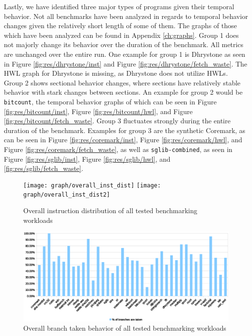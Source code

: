 \documentclass[../bachelor_paper.tex]{subfiles}
\begin{document}
Lastly, we have identified three major types of programs given their temporal behavior. Not all benchmarks have been analyzed in regards to temporal behavior changes given the relatively short length of some of them. The graphs of those which have been analyzed can be found in Appendix \ref{ch:graphs}. Group 1 does not majorly change its behavior over the duration of the benchmark. All metrics are unchanged over the entire run. One example for group 1 is Dhrystone as seen in Figure \ref{fig:res/dhrystone/inst} and Figure \ref{fig:res/dhrystone/fetch_waste}. The \ac{HWL} graph for Dhrystone is missing, as Dhrystone does not utilize \acp{HWL}. Group 2 shows sectional behavior changes, where sections have relatively stable behavior with stark changes between sections. An example for group 2 would be \texttt{bitcount}, the temporal behavior graphs of which can be seen in Figure \ref{fig:res/bitcount/inst}, Figure \ref{fig:res/bitcount/hwl}, and Figure \ref{fig:res/bitcount/fetch_waste}. Group 3 fluctuates strongly during the entire duration of the benchmark. Examples for group 3 are the synthetic Coremark, as can be seen in Figure \ref{fig:res/coremark/inst}, Figure \ref{fig:res/coremark/hwl}, and Figure \ref{fig:res/coremark/fetch_waste}, as well as \texttt{sglib-combined}, as seen in Figure \ref{fig:res/sglib/inst}, Figure \ref{fig:res/sglib/hwl}, and \ref{fig:res/sglib/fetch_waste}.

\begin{figure}
    \centering
    \texttt{[image: graph/overall\_inst\_dist]}
    \texttt{[image: graph/overall\_inst\_dist2]}
    \caption{Overall instruction distribution of all tested benchmarking workloads}
    \label{fig:res/overall/inst}
\end{figure}

\begin{figure}
    \centering
    \includegraphics[width=\textwidth]{img/graph/overall_branch_tk.eps}
    \caption{Overall branch taken behavior of all tested benchmarking workloads}
    \label{fig:res/overall/branch_tk}
\end{figure}
\end{document}
